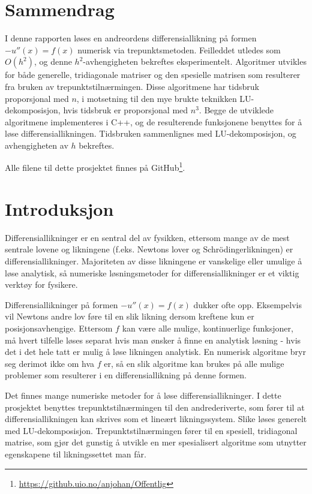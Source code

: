 \documentclass[12pt,norsk,a4paper]{report}
\begin{document}

\pagestyle{fancy}
\tableofcontents

\section{Sammendrag}
I denne rapporten løses en andreordens differensiallikning på formen \(-u''(x)=f(x)\) numerisk via trepunktsmetoden. Feilleddet utledes som \(O(h^2)\), og denne \(h^2\)-avhengigheten bekreftes eksperimentelt. Algoritmer utvikles for både generelle, tridiagonale matriser og den spesielle matrisen som resulterer fra bruken av trepunktstilnærmingen. Disse algoritmene har tidsbruk proporsjonal med \(n\), i motsetning til den mye brukte teknikken LU-dekomposisjon, hvis tidsbruk er proporsjonal med \(n^3\). Begge de utviklede algoritmene implementeres i C++, og de resulterende funksjonene benyttes for å løse differensiallikningen. Tidsbruken sammenlignes med LU-dekomposisjon, og avhengigheten av \(h\) bekreftes.

Alle filene til dette prosjektet finnes på GitHub\footnote{\url{https://github.uio.no/anjohan/Offentlig}}.


\section{Introduksjon}
Differensiallikninger er en sentral del av fysikken, ettersom mange av de mest sentrale lovene og likningene (f.eks. Newtons lover og Schrödingerlikningen) er differensiallikninger. Majoriteten av disse likningene er vanskelige eller umulige å løse analytisk, så numeriske løsningsmetoder for differensiallikninger er et viktig verktøy for fysikere.

Differensiallikninger på formen \(-u''(x)=f(x)\) dukker ofte opp. Eksempelvis vil Newtons andre lov føre til en slik likning dersom kreftene kun er posisjonsavhengige. Ettersom \(f\) kan være alle mulige, kontinuerlige funksjoner, må hvert tilfelle løses separat hvis man ønsker å finne en analytisk løsning - hvis det i det hele tatt er mulig å løse likningen analytisk. En numerisk algoritme bryr seg derimot ikke om hva \(f\) er, så en slik algoritme kan brukes på alle mulige problemer som resulterer i en differensiallikning på denne formen.

Det finnes mange numeriske metoder for å løse differensiallikninger. I dette prosjektet benyttes trepunktstilnærmingen til den andrederiverte, som fører til at differensiallikningen kan skrives som et lineært likningssystem. Slike løses generelt med LU-dekomposisjon. Trepunktstilnærmingen fører til en spesiell, tridiagonal matrise, som gjør det gunstig å utvikle en mer spesialisert algoritme som utnytter egenskapene til likningssettet man får.
\end{document}
